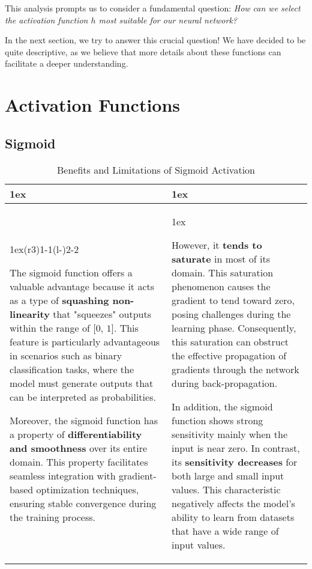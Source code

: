 This analysis prompts us to consider a fundamental question: \textit{How can we select the activation function $h$ most suitable for our neural network?}

In the next section, we try to answer this crucial question! We have decided to be quite descriptive, as we believe that more details about these functions can facilitate a deeper understanding.

\section{Activation Functions}

\subsection{Sigmoid}

\begin{table}[h]
\begin{tabularx}{\linewidth}{>{\parskip1ex}X@{\kern4\tabcolsep}>{\parskip1ex}X}
\toprule
\hfil\bfseries \color{myblue!80!black}{Pros}
&
\hfil\bfseries \color{myblue!80!black}{Cons}
\\\cmidrule(r{3\tabcolsep}){1-1}\cmidrule(l{-\tabcolsep}){2-2}

The sigmoid function offers a valuable advantage because it acts as a type of \textbf{\textcolor{myblue!80!black}{squashing non-linearity}} that "squeezes" outputs within the range of [$0$, $1$]. This feature is particularly advantageous in scenarios such as binary classification tasks, where the model must generate outputs that can be interpreted as probabilities.

Moreover, the sigmoid function has a property of \textbf{\textcolor{myblue!80!black}{differentiability and smoothness}} over its entire domain. This property facilitates seamless integration with gradient-based optimization techniques, ensuring stable convergence during the training process.
&

However, it \textbf{\textcolor{myblue!80!black}{tends to saturate}} in most of its domain. This saturation phenomenon causes the gradient to tend toward zero, posing challenges during the learning phase. Consequently, this saturation can obstruct the effective propagation of gradients through the network during back-propagation.

In addition, the sigmoid function shows strong sensitivity mainly when the input is near zero. In contrast, its \textbf{\textcolor{myblue!80!black}{sensitivity decreases}} for both large and small input values. This characteristic negatively affects the model's ability to learn from datasets that have a wide range of input values.
\\\bottomrule
\end{tabularx}
\caption{Benefits and Limitations of Sigmoid Activation}
\end{table}

